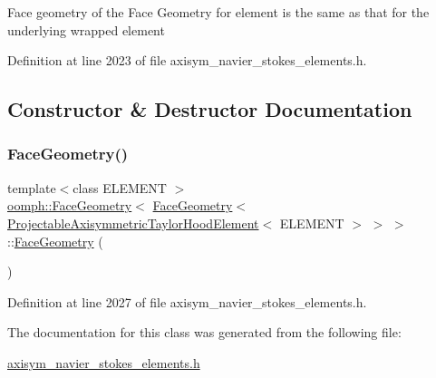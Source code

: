 Face geometry of the Face Geometry for element is the same as that for the underlying wrapped element 

Definition at line 2023 of file axisym\+\_\+navier\+\_\+stokes\+\_\+elements.\+h.



\subsection{Constructor \& Destructor Documentation}
\mbox{\label{classoomph_1_1FaceGeometry_3_01FaceGeometry_3_01ProjectableAxisymmetricTaylorHoodElement_3_01ELEMENT_01_4_01_4_01_4_a3ddd45fadbc56d2f734002aa04b8f0bd}} 
\subsubsection{\texorpdfstring{Face\+Geometry()}{FaceGeometry()}}
{\footnotesize\ttfamily template$<$class E\+L\+E\+M\+E\+NT $>$ \\
\hyperlink{classoomph_1_1FaceGeometry}{oomph\+::\+Face\+Geometry}$<$ \hyperlink{classoomph_1_1FaceGeometry}{Face\+Geometry}$<$ \hyperlink{classoomph_1_1ProjectableAxisymmetricTaylorHoodElement}{Projectable\+Axisymmetric\+Taylor\+Hood\+Element}$<$ E\+L\+E\+M\+E\+NT $>$ $>$ $>$\+::\hyperlink{classoomph_1_1FaceGeometry}{Face\+Geometry} (\begin{DoxyParamCaption}{ }\end{DoxyParamCaption})\hspace{0.3cm}{\ttfamily [inline]}}



Definition at line 2027 of file axisym\+\_\+navier\+\_\+stokes\+\_\+elements.\+h.



The documentation for this class was generated from the following file\+:\begin{DoxyCompactItemize}
\item 
\hyperlink{axisym__navier__stokes__elements_8h}{axisym\+\_\+navier\+\_\+stokes\+\_\+elements.\+h}\end{DoxyCompactItemize}
